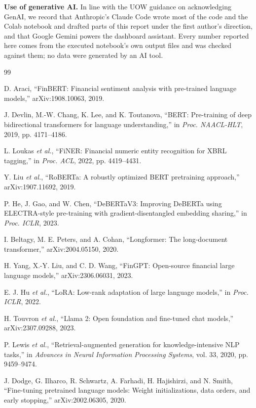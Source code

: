 \documentclass[11pt,a4paper]{article}
\begin{document}
\textbf{Use of generative AI.} In line with the UOW guidance on acknowledging GenAI, we record that Anthropic's Claude Code wrote most of the code and the Colab notebook and drafted parts of this report under the first author's direction, and that Google Gemini powers the dashboard assistant. Every number reported here comes from the executed notebook's own output files and was checked against them; no data were generated by an AI tool.

\begin{thebibliography}{99}

 D. Araci, ``FinBERT: Financial sentiment analysis with pre-trained language models,'' arXiv:1908.10063, 2019.

 J. Devlin, M.-W. Chang, K. Lee, and K. Toutanova, ``BERT: Pre-training of deep bidirectional transformers for language understanding,'' in \emph{Proc. NAACL-HLT}, 2019, pp. 4171--4186.

 L. Loukas \emph{et al.}, ``FiNER: Financial numeric entity recognition for XBRL tagging,'' in \emph{Proc. ACL}, 2022, pp. 4419--4431.

 Y. Liu \emph{et al.}, ``RoBERTa: A robustly optimized BERT pretraining approach,'' arXiv:1907.11692, 2019.

 P. He, J. Gao, and W. Chen, ``DeBERTaV3: Improving DeBERTa using ELECTRA-style pre-training with gradient-disentangled embedding sharing,'' in \emph{Proc. ICLR}, 2023.

 I. Beltagy, M. E. Peters, and A. Cohan, ``Longformer: The long-document transformer,'' arXiv:2004.05150, 2020.

 H. Yang, X.-Y. Liu, and C. D. Wang, ``FinGPT: Open-source financial large language models,'' arXiv:2306.06031, 2023.

 E. J. Hu \emph{et al.}, ``LoRA: Low-rank adaptation of large language models,'' in \emph{Proc. ICLR}, 2022.

 H. Touvron \emph{et al.}, ``Llama 2: Open foundation and fine-tuned chat models,'' arXiv:2307.09288, 2023.

 P. Lewis \emph{et al.}, ``Retrieval-augmented generation for knowledge-intensive NLP tasks,'' in \emph{Advances in Neural Information Processing Systems}, vol. 33, 2020, pp. 9459--9474.

 J. Dodge, G. Ilharco, R. Schwartz, A. Farhadi, H. Hajishirzi, and N. Smith, ``Fine-tuning pretrained language models: Weight initializations, data orders, and early stopping,'' arXiv:2002.06305, 2020.


\end{thebibliography}
\end{document}
